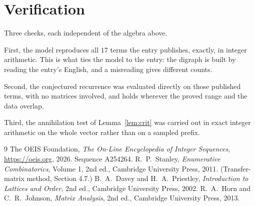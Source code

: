 \documentclass[11pt,a4paper]{article}
\theoremstyle{plain}
\theoremstyle{definition}
\begin{document}
\section{Verification}

Three checks, each independent of the algebra above.

First, the model reproduces all $17$ terms the entry publishes, exactly, in integer
arithmetic. This is what ties the model to the entry: the digraph is built by reading the
entry's English, and a misreading gives different counts.

Second, the conjectured recurrence was evaluated directly on those published terms, with no
matrices involved, and holds wherever the proved range and the data overlap.

Third, the annihilation test of Lemma~\ref{lem:crit} was carried out in exact integer
arithmetic on the whole vector rather than on a sampled prefix.

\begin{thebibliography}{9}
 The OEIS Foundation, \emph{The On-Line Encyclopedia of Integer
Sequences}, \url{https://oeis.org}, 2026. Sequence A254264.
 R.~P.~Stanley, \emph{Enumerative Combinatorics}, Volume 1, 2nd ed.,
Cambridge University Press, 2011. (Transfer-matrix method, Section 4.7.)
 B.~A.~Davey and H.~A.~Priestley, \emph{Introduction to Lattices and
Order}, 2nd ed., Cambridge University Press, 2002.
 R.~A.~Horn and C.~R.~Johnson, \emph{Matrix Analysis}, 2nd ed., Cambridge
University Press, 2013.
\end{thebibliography}
\end{document}
